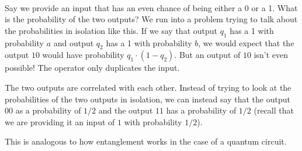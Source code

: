\documentclass[runningheads]{llncs}
\begin{document}
\begin{minipage}{.5\textwidth}
    \centering
{}
\end{minipage}
\\

Say we provide an input that has an even chance of being either a 0 or a 1. What is the probability of the two outputs?
We run into a problem trying to talk about the probabilities in isolation like this. If we say that output $q_1$ has a 1 with probability
$a$ and output $q_2$ has a 1 with probability $b$, we would expect that the output $10$ would have probability $q_1 \cdot (1 - q_2)$. But an
output of $10$ isn't even possible! The operator only duplicates the input.

The two outputs are correlated with each other. Instead of trying to look at the probabilities of the two outputs in isolation, we can
instead say that the output $00$ as a probability of $1/2$ and the output $11$ has a probability of $1/2$ (recall that we are providing it an input of $1$ with probability $1/2$).

This is analogous to how entanglement works in the case of a quantum circuit.
\end{document}
